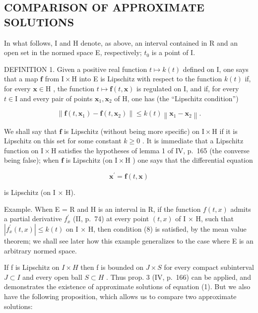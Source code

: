 \subsection{COMPARISON OF APPROXIMATE SOLUTIONS}

In what follows, I and H denote, as above, an interval contained in R and an open set in the normed space E, respectively; \(t_{0}\) is a point of I.

DEFINITION 1. Given a positive real function \(t \mapsto k(t)\) defined on I, one says that a map \(\mathbf{f}\) from \(\mathrm{I} \times \mathrm{H}\) into E is Lipschitz with respect to the function \(k(t)\) if, for every \(\mathbf{x} \in \mathrm{H}\) , the function \(t \mapsto \mathbf{f}(t, \mathbf{x})\) is regulated on I, and if, for every \(t \in \mathrm{I}\) and every pair of points \(\mathbf{x}_1, \mathbf{x}_2\) of H, one has (the ``Lipschitz condition'')

\[
\left\| \mathbf {f} (t, \mathbf {x} _ {1}) - \mathbf {f} (t, \mathbf {x} _ {2}) \right\| \leqslant k (t) \left\| \mathbf {x} _ {1} - \mathbf {x} _ {2} \right\|.\tag{8}
\]

We shall say that \(\mathbf{f}\) is Lipschitz (without being more specific) on \(\mathrm{I} \times \mathrm{H}\) if it is Lipschitz on this set for some constant \(k \geqslant 0\) . It is immediate that a Lipschitz function on \(\mathrm{I} \times \mathrm{H}\) satisfies the hypotheses of lemma 1 of IV, p.~165 (the converse being false); when \(\mathbf{f}\) is Lipschitz (on \(\mathrm{I} \times \mathrm{H}\) ) one says that the differential equation

\[
\mathbf {x} ^ {\prime} = \mathbf {f} (t, \mathbf {x})\tag{1}
\]

is Lipschitz (on I × H).

Example. When E = R and H is an interval in R, if the function \(f(t, x)\) admits a partial derivative \(f_{x}^{\prime}\) (II, p.~74) at every point \((t, x)\) of I × H, such that \(|f_{x}^{\prime}(t, x)| \leqslant k(t)\) on I × H, then condition (8) is satisfied, by the mean value theorem; we shall see later how this example generalizes to the case where E is an arbitrary normed space.

If f is Lipschitz on \(I \times H\) then f is bounded on \(J \times S\) for every compact subinterval \(J \subset I\) and every open ball \(S \subset H\) . Thus prop. 3 (IV, p.~166) can be applied, and demonstrates the existence of approximate solutions of equation (1). But we also have the following proposition, which allows us to compare two approximate solutions:

